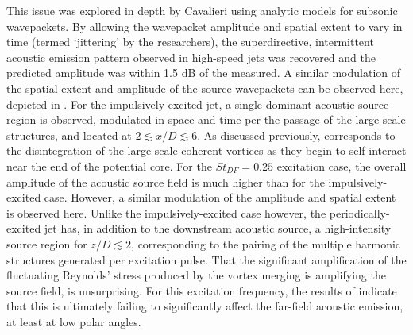 This issue was explored in depth by Cavalieri \etal \citep{Cavalieri2010} using analytic models for subsonic wavepackets.
By allowing the wavepacket amplitude and spatial extent to vary in time (termed `jittering' by the researchers), the superdirective, intermittent acoustic emission pattern observed in high-speed jets was recovered and the predicted amplitude was within 1.5 dB of the measured.
A similar modulation of the spatial extent and amplitude of the source wavepackets can be observed here, depicted in .
For the impulsively-excited jet, a single dominant acoustic source region is observed, modulated in space and time per the passage of the large-scale structures, and located at $ 2 \lesssim x/D \lesssim 6$.
As discussed previously, corresponds to the disintegration of the large-scale coherent vortices as they begin to self-interact near the end of the potential core.
For the $St_{DF} = 0.25$ excitation case, the overall amplitude of the acoustic source field is much higher than for the impulsively-excited case.
However, a similar modulation of the amplitude and spatial extent is observed here.
Unlike the impulsively-excited case however, the periodically-excited jet has, in addition to the downstream acoustic source, a high-intensity source region  for $z/D \lesssim 2$, corresponding to the pairing of the multiple harmonic structures generated per excitation pulse.
That the significant amplification of the fluctuating Reynolds' stress produced by the vortex merging is amplifying the source field, is unsurprising.
For this excitation frequency, the results of  indicate that this is ultimately failing to significantly affect the far-field acoustic emission, at least at low polar angles.
